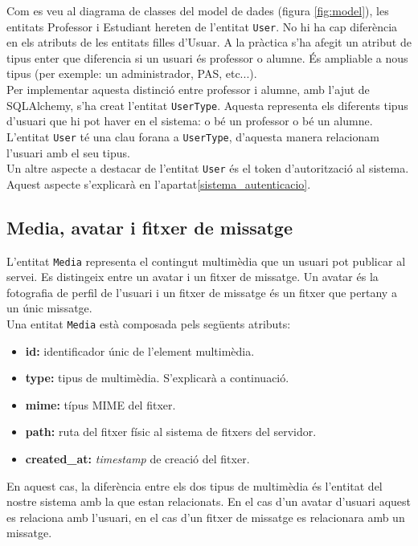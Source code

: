	Com es veu al diagrama de classes del model de dades (figura \ref{fig:model}), les entitats Professor i Estudiant hereten de l'entitat \texttt{User}. No hi ha cap diferència en els atributs de les entitats filles d'Usuar. A la pràctica s'ha afegit un atribut de tipus enter que diferencia si un usuari és professor o alumne. És ampliable a nous tipus (per exemple: un administrador, \ac{PAS}, etc...). \\
	
	Per implementar aquesta distinció entre professor i alumne, amb l'ajut de SQLAlchemy, s'ha creat l'entitat \texttt{UserType}. Aquesta representa els diferents tipus d'usuari que hi pot haver en el sistema: o bé un professor o bé un alumne. L'entitat \texttt{User} té una clau forana a \texttt{UserType}, d'aquesta manera relacionam l'usuari amb el seu tipus. \\
	
	Un altre aspecte a destacar de l'entitat \texttt{User} és el token d'autorització al sistema. Aquest aspecte s'explicarà en l'apartat\ref{sistema_autenticacio}.


	\subsection{Media, avatar i fitxer de missatge} \label{media_avatar_fitxer}
	
	L'entitat \texttt{Media} representa el contingut multimèdia que un usuari pot publicar al servei. Es distingeix entre un avatar i un fitxer de missatge. Un avatar és la fotografia de perfil de l'usuari i un fitxer de missatge és un fitxer que pertany a un únic missatge. \\
	
	Una entitat \texttt{Media} està composada pels següents atributs:
	
	\begin{itemize}
		\item \textbf{id:} identificador únic de l'element multimèdia.
		\item \textbf{type:} tipus de multimèdia. S'explicarà a continuació.
		\item \textbf{mime:} típus \ac{MIME} del fitxer.
		\item \textbf{path:} ruta del fitxer físic al sistema de fitxers del servidor.
		\item \textbf{created\_at:} \emph{timestamp} de creació del fitxer.
	\end{itemize}
	
	En aquest cas, la diferència entre els dos tipus de multimèdia és l'entitat del nostre sistema amb la que estan relacionats. En el cas d'un avatar d'usuari aquest es relaciona amb l'usuari, en el cas d'un fitxer de missatge es relacionara amb un missatge.\\

